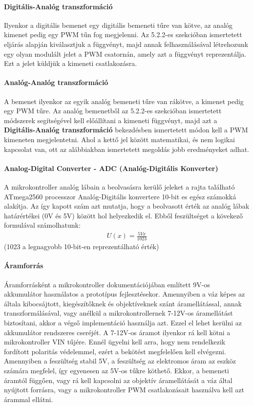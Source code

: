 \paragraph{Digitális-Analóg transzformáció}
Ilyenkor a digitális bemenet egy digitális bemeneti tűre van kötve, az analóg kimenet pedig egy PWM tűn fog megjelenni. Az 5.2.2-es szekcióban ismertetett eljárás alapján kiválasztjuk a függvényt, majd annak felhasználásával létrehozunk egy olyan modulált jelet a PWM csatornán, amely azt a függvényt reprezentálja. Ezt a jelet küldjük a kimeneti csatlakozásra.
\paragraph{Analóg-Analóg transzformáció}
A bemenet ilyenkor az egyik analóg bemeneti tűre van rákötve, a kimenet pedig egy PWM tűre. Az analóg bemenetből az 5.2.2-es szekcióban ismertetett módszerek segítségével kell előállítani a kimeneti függvényt, majd azt a \textbf{Digitális-Analóg transzformáció} bekezdésben ismertetett módon kell a PWM kimeneten megjelentetni. Ahol a kettő jel között matematikai, és nem logikai kapcsolat van, ott az alábbiakban ismertetett megoldás jobb eredményeket adhat.
\paragraph{Analog-Digital Converter - ADC (Analóg-Digitális Konverter)}
A mikrokontroller analóg lábain a beolvasásra kerülő jeleket a rajta található ATmega2560 processzor\cite{arduino_docs} Analóg-Digitális konvertere 10-bit es egész számokká alakítja\cite{ATmega_processor_datasheet}. Az így kapott szám azt mutatja, hogy a beolvasott érték az analóg lábak határértékei (0V és 5V) között hol helyezkedik el. Ebből feszültséget a kövekező formulával számolhatunk:
\begin{align}
    U(x) = \frac{5Vx}{1023}
\end{align}
\small (1023 a legnagyobb 10-bit-en reprezentálható érték)

\paragraph{Áramforrás}
Áramforrásként a  mikrokontroller dokumentációjában említett 9V-os akkumulátor használatos a prototípus fejlesztésekor. Amennyiben a váz képes az általa kibocsájtott, kiegészítőknek és objektíveknek szánt áramellátással, annak transzformálásával, vagy anélkül a mikrokontrollernek 7-12V-os\cite{arduino_aram} áramellátást biztosítani, akkor a végső implementáció használja azt. Ezzel el lehet kerülni az akkumulátor rendszeres cseréjét. A 7-12V-os áramot ilyenkor rá kell kötni a mikrokontroller VIN tűjére. Ennél ügyelni kell arra, hogy nem rendelkezik fordított polaritás védelemmel, ezért a bekötést megfelelően kell elvégezni.\cite{arduino_docs} Amennyiben a feszültség stabil 5V, a feszültség az elektromos áram az eszköz számára megfelel, így egyenesen az 5V-os tűkre köthető. Ekkor, a bemeneti áramtól függően, vagy rá kell kapcsolni az objektív áramellátását a váz által nyújtott forrásra, vagy a mikrokontroller PWM csatlakozásait használva kell azt árammal ellátni.

